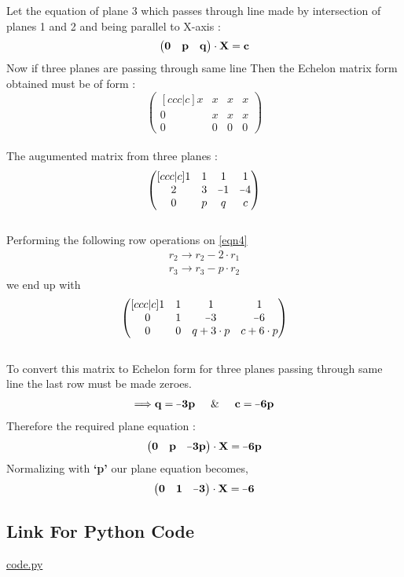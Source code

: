\documentclass[twocolumn]{article}
\let\vec\mathbf
\newcommand*{\matminus}{%
  \leavevmode
  \hphantom{0}%
  \llap{%
    \settowidth{\dimen0 }{$0$}%
    \resizebox{1.1\dimen0 }{\height}{$-$}%
  }%
}
\begin{document}
Let the equation of plane 3 which passes through line made by intersection of planes 1 and 2 and being parallel to X-axis : 
\begin{equation}
\begin{pmatrix}{\bf0}&{\bf p}&{\bf q}\end{pmatrix}\cdot{\bf \vec{X}} = \bf c \label{eqn3}
\end{equation}
Now if three planes are passing through same line Then the Echelon matrix form obtained must be of form :
\begin{equation}
\begin{pmatrix}[ccc|c]
 x & x & x & x\\  0 & x & x & x \\ 0 & 0 & 0 & 0
\end{pmatrix} \nonumber
\end{equation}
\\The augumented matrix from three planes :
\begin{equation}
\begin{pmatrix}[ccc|c]
 1 & 1 & 1 & 1\\  2 & 3 & \matminus1 & \matminus4 \\ 0 & p & q & c \label{eqn4}
\end{pmatrix} 
\end{equation}
\\ Performing the following row operations on
\eqref{eqn4}
\begin{align}
r_2 \rightarrow r_2-2\cdot r_1  \label{eq5} \\
r_3 \rightarrow r_3-p\cdot r_2 \label{eq6}
\end{align}
we end up with
\begin{equation}
\begin{pmatrix}[ccc|c]
 1 & 1 & 1 & 1\\  0 & 1 & \matminus3 & \matminus6 \\ 0 & 0 & q +3\cdot p & c +6\cdot p
\end{pmatrix} \label{eq7}
\end{equation}
\\To convert this matrix to Echelon form for three planes passing through same line the last row must be made zeroes.
\begin{align}
\bf \Longrightarrow q=\matminus3p \hspace*{0.5cm}\&\hspace*{0.5cm} c=\matminus6p \label{eqn8}
\end{align}
Therefore the required plane equation :
\begin{align}
\begin{pmatrix}{\bf0}&{\bf p}&{\bf \matminus 3p }\end{pmatrix}\cdot{\bf \vec{X}} = \bf \matminus6p \label{eqn9}
\end{align}
Normalizing  with {\bf `p'} our plane equation becomes,
\begin{align}
\begin{pmatrix}{\bf0}&{\bf 1}&{\bf \matminus 3 }\end{pmatrix}\cdot{\bf \vec{X}} = \bf \matminus6 \label{eqn10}
\end{align}
\subsection*{Link For Python Code}
\href{https://github.com/vikramealleti/EE5600/blob/master/Assignment_1/Linalgassignment.py}{code.py}
\end{document}
